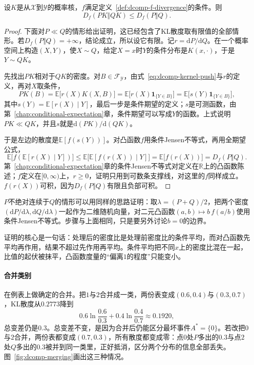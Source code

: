 \begin{theorem}[后处理不增加$f$散度]
\label{thm:dcomp-data-processing}
设$K$是从$\mathcal{X}$到$\mathcal{Y}$的概率核，$f$满足定义~\ref{def:dcomp-f-divergence}的条件。则
\begin{equation}
 D_f(PK\Vert QK)\leq D_f(P\Vert Q) .
 \label{eq:dcomp-data-processing}
\end{equation}
\end{theorem}

\begin{proof}
下面对$P\ll Q$的情形给出证明，这已经包含了KL散度取有限值的全部情形。若$D_f(P\Vert Q)=+\infty$，结论成立，所以设它有限。记$r=\mathrm{d}P/\mathrm{d}Q$。在一个概率空间上构造$(X,Y)$，使$X\sim Q$，给定$X=x$时$Y$的条件分布是$K(x,\cdot)$，于是$Y\sim QK$。

先找出$PK$相对于$QK$的密度。对$B\in\mathcal{F}_{\mathcal{Y}}$，由式~\eqref{eq:dcomp-kernel-push}与$r$的定义，再对$X$取条件，
\[
 PK(B)=\mathbb{E}\bigl[r(X)K(X,B)\bigr]=\mathbb{E}\bigl[r(X)\mathbf{1}_{\{Y\in B\}}\bigr]=\mathbb{E}\bigl[s(Y)\mathbf{1}_{\{Y\in B\}}\bigr],
\]
其中$s(Y)=\mathbb{E}[r(X)\mid Y]$，最后一步是条件期望的定义；$s$是可测函数，由第~\ref{chap:conditional-expectation}章，条件期望可以写成$Y$的函数。上式说明$PK\ll QK$，并且$s$就是$\mathrm{d}(PK)/\mathrm{d}(QK)$。

于是左边的散度是$\mathbb{E}[f(s(Y))]$。对凸函数$f$用条件Jensen不等式，再用全期望公式，
\[
 \mathbb{E}\bigl[f(\mathbb{E}[r(X)\mid Y])\bigr]\leq\mathbb{E}\bigl[\mathbb{E}[f(r(X))\mid Y]\bigr]=\mathbb{E}\bigl[f(r(X))\bigr]=D_f(P\Vert Q) .
\]
第~\ref{chap:conditional-expectation}章的条件Jensen不等式对定义在$\mathbb{R}$上的凸函数陈述；$f$定义在$[0,\infty)$上，$r\geq0$，证明只用到可数条支撑线，对这里的$f$同样成立。$f(r(X))$可积，因为$D_f(P\Vert Q)$有限且负部可积。
\end{proof}

$P$不绝对连续于$Q$的情形可以用同样的思路证明：取$\lambda=(P+Q)/2$，把两个密度$(\mathrm{d}P/\mathrm{d}\lambda,\mathrm{d}Q/\mathrm{d}\lambda)$一起作为二维随机向量，对二元凸函数$(a,b)\mapsto b\,f(a/b)$使用条件Jensen不等式。步骤与上面相同，只是要另外讨论$b=0$的边界。

证明的核心是一句话：处理后的密度比是处理前密度比的条件平均，而对凸函数先平均再作用，结果不超过先作用再平均。条件平均把不同$x$上的密度比混在一起，比值的起伏被抹平，凸函数度量的“偏离$1$的程度”只能变小。

\paragraph{合并类别}
在例表上做确定的合并。把$1$与$2$合并成一类，两份表变成$(0.6,0.4)$与$(0.3,0.7)$，KL散度从$0.2773$降到
\[
 0.6\ln\frac{0.6}{0.3}+0.4\ln\frac{0.4}{0.7}\approx0.1920 ,
\]
总变差仍是$0.3$。总变差不变，是因为合并后仍能区分最坏事件$A^{*}=\{0\}$。若改把$0$与$2$合并，两份表都变成$(0.7,0.3)$，所有散度都变成零：点$0$处$P$多出的$0.3$与点$2$处$Q$多出的$0.3$被并到同一类里，正好抵消，区分两个分布的信息全部丢失。图~\ref{fig:dcomp-merging}画出这三种情况。

